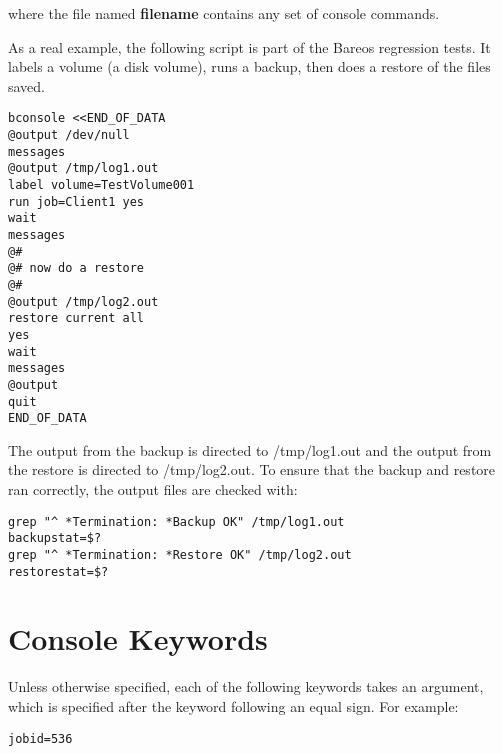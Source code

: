 where the file named {\bf filename} contains any set of console commands.

As a real example, the following script is part of the Bareos regression
tests. It labels a volume (a disk volume), runs a backup, then does a restore
of the files saved.

\footnotesize
\begin{verbatim}
bconsole <<END_OF_DATA
@output /dev/null
messages
@output /tmp/log1.out
label volume=TestVolume001
run job=Client1 yes
wait
messages
@#
@# now do a restore
@#
@output /tmp/log2.out
restore current all
yes
wait
messages
@output
quit
END_OF_DATA
\end{verbatim}
\normalsize

The output from the backup is directed to /tmp/log1.out and the output from
the restore is directed to /tmp/log2.out. To ensure that the backup and
restore ran correctly, the output files are checked with:

\footnotesize
\begin{verbatim}
grep "^ *Termination: *Backup OK" /tmp/log1.out
backupstat=$?
grep "^ *Termination: *Restore OK" /tmp/log2.out
restorestat=$?
\end{verbatim}
\normalsize


\section{Console Keywords}

Unless otherwise specified, each of the following keywords
takes an argument, which is specified after the keyword following
an equal sign. For example:

\begin{verbatim}
jobid=536
\end{verbatim}

